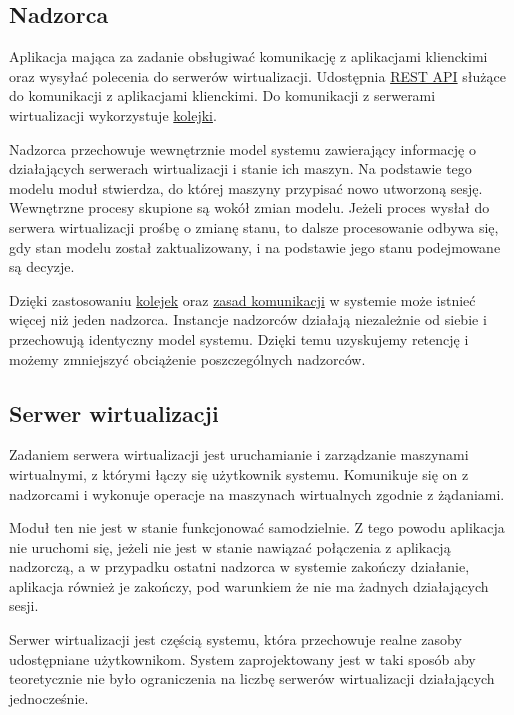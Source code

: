 \documentclass[../opis-rozwiazania.tex]{subfiles}
\begin{document}
\subsection{Nadzorca}
\label{modules:overseer}

Aplikacja mająca za zadanie obsługiwać komunikację z aplikacjami klienckimi oraz wysyłać polecenia do serwerów wirtualizacji. Udostępnia \hyperref[communication:api]{REST API} służące do komunikacji z aplikacjami klienckimi. Do komunikacji z serwerami wirtualizacji wykorzystuje \hyperref[modules:broker]{kolejki}.

Nadzorca przechowuje wewnętrznie model systemu zawierający informację o działających serwerach wirtualizacji i stanie ich maszyn. Na podstawie tego modelu moduł stwierdza, do której maszyny przypisać nowo utworzoną sesję. Wewnętrzne procesy skupione są wokół zmian modelu. Jeżeli proces wysłał do serwera wirtualizacji prośbę o zmianę stanu, to dalsze procesowanie odbywa się, gdy stan modelu został zaktualizowany, i na podstawie jego stanu podejmowane są decyzje.

Dzięki zastosowaniu \hyperref[modules:broker]{kolejek} oraz \hyperref[communication:broker]{zasad komunikacji} w systemie może istnieć więcej niż jeden nadzorca. Instancje nadzorców działają niezależnie od siebie i przechowują identyczny model systemu. Dzięki temu uzyskujemy retencję i możemy zmniejszyć obciążenie poszczególnych nadzorców.

\subsection{Serwer wirtualizacji}
\label{modules:virtsrv}

Zadaniem serwera wirtualizacji jest uruchamianie i zarządzanie maszynami wirtualnymi, z którymi łączy się użytkownik systemu. Komunikuje się on z nadzorcami i wykonuje operacje na maszynach wirtualnych zgodnie z żądaniami.

Moduł ten nie jest w stanie funkcjonować samodzielnie. Z tego powodu aplikacja nie uruchomi się, jeżeli nie jest w stanie nawiązać połączenia z aplikacją nadzorczą, a w przypadku ostatni nadzorca w systemie zakończy działanie, aplikacja również je zakończy, pod warunkiem że nie ma żadnych działających sesji.

Serwer wirtualizacji jest częścią systemu, która przechowuje realne zasoby udostępniane użytkownikom.
System zaprojektowany jest w taki sposób aby teoretycznie nie było ograniczenia na liczbę serwerów wirtualizacji działających jednocześnie.
\end{document}
